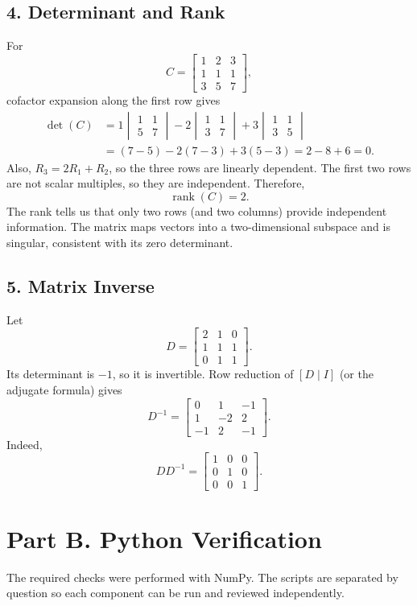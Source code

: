 \documentclass[11pt]{article}
\begin{document}
\subsection*{4. Determinant and Rank}
For
\[
C=\begin{bmatrix}1&2&3\\1&1&1\\3&5&7\end{bmatrix},
\]
cofactor expansion along the first row gives
\begin{align*}
\det(C)
&=1\begin{vmatrix}1&1\\5&7\end{vmatrix}
-2\begin{vmatrix}1&1\\3&7\end{vmatrix}
+3\begin{vmatrix}1&1\\3&5\end{vmatrix}\\
&=(7-5)-2(7-3)+3(5-3)=2-8+6=\boxed{0}.
\end{align*}
Also, $R_3=2R_1+R_2$, so the three rows are linearly dependent. The first two rows are not scalar multiples, so they are independent. Therefore,
\[
\boxed{\operatorname{rank}(C)=2}.
\]
The rank tells us that only two rows (and two columns) provide independent information. The matrix maps vectors into a two-dimensional subspace and is singular, consistent with its zero determinant.

\subsection*{5. Matrix Inverse}
Let
\[
D=\begin{bmatrix}2&1&0\\1&1&1\\0&1&1\end{bmatrix}.
\]
Its determinant is $-1$, so it is invertible. Row reduction of $[D\mid I]$ (or the adjugate formula) gives
\[
\boxed{D^{-1}=\begin{bmatrix}0&1&-1\\1&-2&2\\-1&2&-1\end{bmatrix}}.
\]
Indeed,
\[
DD^{-1}=\begin{bmatrix}1&0&0\\0&1&0\\0&0&1\end{bmatrix}.
\]

\section*{Part B. Python Verification}
The required checks were performed with NumPy. The scripts are separated by question so each component can be run and reviewed independently.
\end{document}
